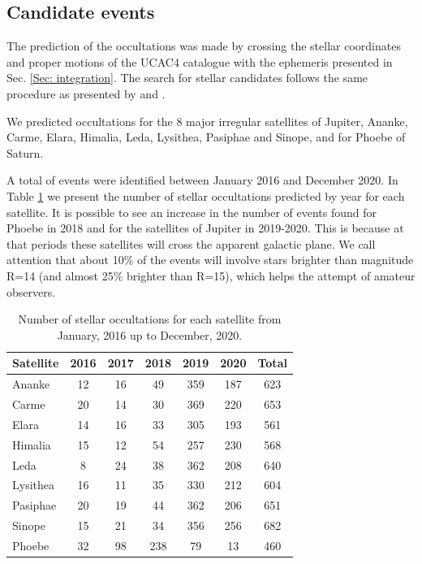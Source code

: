 \documentclass[useAMS,usenatbib]{mn2e}
\begin{document}
\subsection{Candidate events}

The prediction of the occultations was made by crossing the stellar coordinates and proper motions of the UCAC4 catalogue \citep{Zacharias2013} with the ephemeris presented in Sec. \ref{Sec: integration}. The search for stellar candidates follows the same procedure as presented by \cite{Assafin2010, Assafin2012} and \cite{Camargo2014}.

We predicted occultations for the 8 major irregular satellites of Jupiter,  Ananke, Carme, Elara, Himalia, Leda, Lysithea, Pasiphae and Sinope, and for Phoebe of Saturn.

A total of \noccs events were identified between January 2016 and December 2020. In Table \ref{Tab: satellite-occultation} we present the number of stellar occultations predicted by year for each satellite. It is possible to see an increase in the number of events found for Phoebe in 2018 and for the satellites of Jupiter in 2019-2020. This is because at that periods these satellites will cross the apparent galactic plane. We call attention that about 10\% of the events will involve stars brighter than magnitude R=14  (and almost 25\% brighter than R=15), which helps the attempt of amateur observers.

\begin{table}
\caption{\label{Tab: satellite-occultation} Number of stellar occultations for each satellite from January, 2016 up to December, 2020.}
\begin{centering}
\begin{tabular}{lcccccc}
\hline  \hline
Satellite  & 2016 & 2017 & 2018 & 2019 & 2020 & Total \tabularnewline
\hline
Ananke & 12 & 16 & 49 & 359 & 187 & 623 \tabularnewline
Carme & 20 & 14 & 30 & 369 & 220 & 653 \tabularnewline
Elara & 14 & 16 & 33 & 305 & 193 & 561 \tabularnewline
Himalia & 15 & 12 & 54 & 257 & 230 & 568 \tabularnewline
Leda & 8 & 24 & 38 & 362 & 208 & 640 \tabularnewline
Lysithea & 16 & 11 & 35 & 330 & 212 & 604 \tabularnewline
Pasiphae & 20 & 19 & 44 & 362 & 206 & 651 \tabularnewline
Sinope & 15 & 21 & 34 & 356 & 256 & 682 \tabularnewline
\hdashline
Phoebe & 32 & 98 & 238 & 79 & 13 & 460 \tabularnewline
\hline
\end{tabular}
\par \end{centering}
\end{table}
\end{document}
